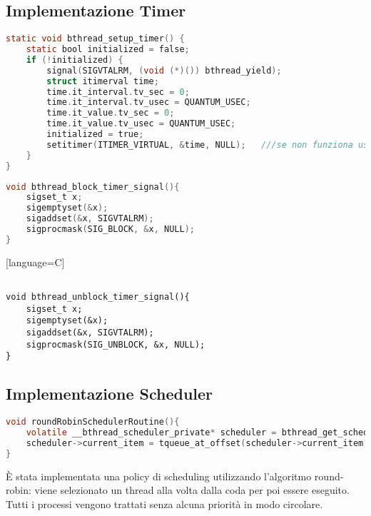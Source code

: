 \documentclass{article}
\begin{document}
\subsection{Implementazione Timer}
\vspace{2mm}

\begin{lstlisting}[language=C]
static void bthread_setup_timer() {
    static bool initialized = false;
    if (!initialized) {
        signal(SIGVTALRM, (void (*)()) bthread_yield);
        struct itimerval time;
        time.it_interval.tv_sec = 0;
        time.it_interval.tv_usec = QUANTUM_USEC;
        time.it_value.tv_sec = 0;
        time.it_value.tv_usec = QUANTUM_USEC;
        initialized = true;
        setitimer(ITIMER_VIRTUAL, &time, NULL);   ///se non funziona usare ITIMER_REAL
    }
}
\end{lstlisting}


\begin{lstlisting}[language=C]
void bthread_block_timer_signal(){
    sigset_t x;
    sigemptyset(&x);
    sigaddset(&x, SIGVTALRM);
    sigprocmask(SIG_BLOCK, &x, NULL);
}
\end{lstlisting}[language=C]

\begin{lstlisting}

void bthread_unblock_timer_signal(){
    sigset_t x;
    sigemptyset(&x);
    sigaddset(&x, SIGVTALRM);
    sigprocmask(SIG_UNBLOCK, &x, NULL);
}
\end{lstlisting}

\vspace{2mm}
\subsection{Implementazione Scheduler}
\vspace{2mm}
\begin{lstlisting}[language=C]
void roundRobinSchedulerRoutine(){
    volatile __bthread_scheduler_private* scheduler = bthread_get_scheduler();
    scheduler->current_item = tqueue_at_offset(scheduler->current_item, 1);
}
\end{lstlisting}

È stata implementata una policy di scheduling utilizzando l'algoritmo round-robin: viene selezionato un thread alla volta dalla coda per poi essere eseguito. Tutti i processi vengono trattati senza alcuna priorità in modo circolare.
\end{document}
